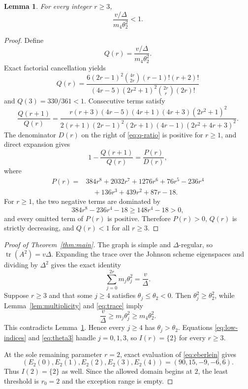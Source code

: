 \documentclass[11pt]{article}
\newtheorem{lemma}[theorem]{Lemma}
\begin{document}
\begin{lemma}\label{lem:trace-ratio}
For every integer $r\geq3$,
\[
 \frac{v/\Delta}{m_4\theta_2^2}<1.
\]
\end{lemma}

\begin{proof}
Define
\[
 Q(r)=\frac{v/\Delta}{m_4\theta_2^2}.
\]
Exact factorial cancellation yields
\begin{equation}\label{eq:q-formula}
 Q(r)=
 \frac{6(2r-1)^2\binom{4r}{2r}(r-1)!(r+2)!}
 {(4r-5)(2r^2+1)^2\binom{2r}{r}(2r)!}
\end{equation}
and $Q(3)=330/361<1$.  Consecutive terms satisfy
\begin{equation}\label{eq:q-ratio}
 \frac{Q(r+1)}{Q(r)}=
 \frac{r(r+3)(4r-5)(4r+1)(4r+3)(2r^2+1)^2}
 {2(r+1)(2r-1)^2(2r+1)(4r-1)(2r^2+4r+3)^2}.
\end{equation}
The denominator $D(r)$ on the right of \eqref{eq:q-ratio} is positive for
$r\geq1$, and direct expansion gives
\begin{equation}\label{eq:p-polynomial}
 1-\frac{Q(r+1)}{Q(r)}=\frac{P(r)}{D(r)},
\end{equation}
where
\begin{align*}
 P(r)={}&384r^8+2032r^7+1276r^6+76r^5-236r^4\\
       &\quad+136r^3+439r^2+87r-18.
\end{align*}
For $r\geq1$, the two negative terms are dominated by
\[
 384r^8-236r^4-18\geq148r^4-18>0,
\]
and every omitted term of $P(r)$ is positive.  Therefore $P(r)>0$,
$Q(r)$ is strictly decreasing, and $Q(r)<1$ for all $r\geq3$.
\end{proof}

\begin{proof}[Proof of Theorem~\ref{thm:main}]
The graph is simple and $\Delta$-regular, so
$\operatorname{tr}(A^2)=v\Delta$.  Expanding the trace over the Johnson
scheme eigenspaces and dividing by $\Delta^2$ gives the exact identity
\begin{equation}\label{eq:trace}
 \sum_{j=0}^{2r}m_j\theta_j^2=\frac{v}{\Delta}.
\end{equation}
Suppose $r\geq3$ and that some $j\geq4$ satisfies
$\theta_j\leq\theta_2<0$.  Then
$\theta_j^2\geq\theta_2^2$, while Lemma~\ref{lem:multiplicity} and
\eqref{eq:trace} imply
\[
 \frac{v}{\Delta}\geq m_j\theta_j^2
 \geq m_4\theta_2^2.
\]
This contradicts Lemma~\ref{lem:trace-ratio}.  Hence every $j\geq4$ has
$\theta_j>\theta_2$.  Equations \eqref{eq:low-indices} and
\eqref{eq:theta3} handle $j=0,1,3$, so $I(r)=\{2\}$ for every $r\geq3$.

At the sole remaining parameter $r=2$, exact evaluation of
\eqref{eq:eberlein} gives
\[
 (E_2(0),E_2(1),E_2(2),E_2(3),E_2(4))
 =(90,15,-9,-6,6).
\]
Thus $I(2)=\{2\}$ as well.  Since the allowed domain begins at $2$, the
least threshold is $r_0=2$ and the exception range is empty.
\end{proof}
\end{document}
